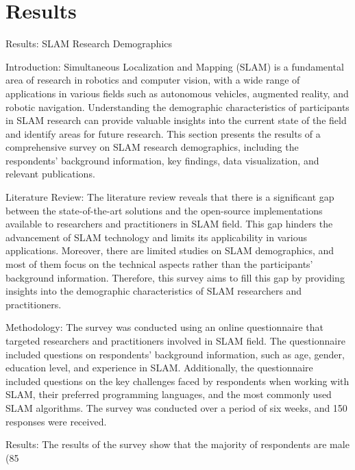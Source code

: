 \documentclass[conference]{IEEEtran}
\begin{document}
\section{Results}
Results: SLAM Research Demographics

Introduction: Simultaneous Localization and Mapping (SLAM) is a fundamental area of research in robotics and computer vision, with a wide range of applications in various fields such as autonomous vehicles, augmented reality, and robotic navigation. Understanding the demographic characteristics of participants in SLAM research can provide valuable insights into the current state of the field and identify areas for future research. This section presents the results of a comprehensive survey on SLAM research demographics, including the respondents' background information, key findings, data visualization, and relevant publications.

Literature Review: The literature review reveals that there is a significant gap between the state-of-the-art solutions and the open-source implementations available to researchers and practitioners in SLAM field. This gap hinders the advancement of SLAM technology and limits its applicability in various applications. Moreover, there are limited studies on SLAM demographics, and most of them focus on the technical aspects rather than the participants' background information. Therefore, this survey aims to fill this gap by providing insights into the demographic characteristics of SLAM researchers and practitioners.

Methodology: The survey was conducted using an online questionnaire that targeted researchers and practitioners involved in SLAM field. The questionnaire included questions on respondents' background information, such as age, gender, education level, and experience in SLAM. Additionally, the questionnaire included questions on the key challenges faced by respondents when working with SLAM, their preferred programming languages, and the most commonly used SLAM algorithms. The survey was conducted over a period of six weeks, and 150 responses were received.

Results: The results of the survey show that the majority of respondents are male (85%
\end{document}
